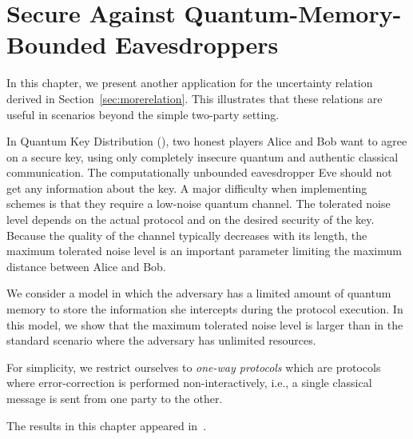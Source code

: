 
\chapter[\QKD Against Bounded Eavesdroppers]
{\QKD Secure Against Quantum-Memory-Bounded Eavesdroppers} \label{chap:qkd}
 In this chapter, we present another
application for the uncertainty relation derived in
Section~\ref{sec:morerelation}. This illustrates that these relations
are useful in scenarios beyond the simple two-party setting.

In Quantum Key Distribution (\QKD), two honest players Alice and Bob
want to agree on a secure key, using only completely insecure quantum
and authentic classical communication. The computationally unbounded
eavesdropper Eve should not get any information about the key. A major
difficulty when implementing \QKD schemes is that they require a
low-noise quantum channel.  The tolerated noise level depends on the
actual protocol and on the desired security of the key.  Because the
quality of the channel typically decreases with its length, the
maximum tolerated noise level
 is an important parameter limiting the
maximum distance between Alice and Bob.

We consider a model in which the adversary has a limited amount of
quantum memory to store the information she intercepts during the
protocol execution. In this model, we show that the maximum
tolerated noise level is larger than in the standard scenario where
the adversary has unlimited resources.  

For simplicity, we restrict ourselves to {\em one-way \QKD protocols}
which are protocols where error-correction is performed
non-interactively, i.e., a single classical message is sent from one
party to the other.

The results in this chapter appeared in~\cite{DFRSS07}.


